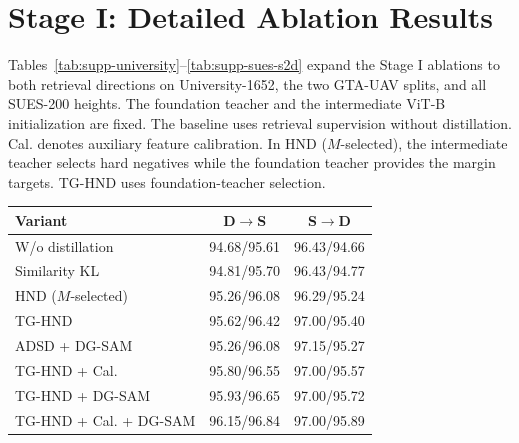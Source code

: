 \section{Stage I: Detailed Ablation Results}
\label{sec:supp-full}
Tables~\ref{tab:supp-university}--\ref{tab:supp-sues-s2d} expand the Stage I ablations to both retrieval directions on University-1652, the two GTA-UAV splits, and all SUES-200 heights. The foundation teacher and the intermediate ViT-B initialization are fixed. The baseline uses retrieval supervision without distillation. Cal. denotes auxiliary feature calibration. In HND ($M$-selected), the intermediate teacher selects hard negatives while the foundation teacher provides the margin targets. TG-HND uses foundation-teacher selection.

\par\medskip\noindent\begin{minipage}{\columnwidth}
\captionsetup{type=table}
\centering
\caption{Stage I University-1652 results. Cells report R@1/AP (\%).}
\label{tab:supp-university}
{\footnotesize\setlength{\tabcolsep}{2pt}\renewcommand{\arraystretch}{1.08}
\begin{tabular*}{\columnwidth}{@{\extracolsep{\fill}}lcc@{}}
\toprule
Variant & D$\rightarrow$S & S$\rightarrow$D \\
\midrule
W/o distillation & 94.68/95.61 & 96.43/94.66 \\
Similarity KL & 94.81/95.70 & 96.43/94.77 \\
HND ($M$-selected) & 95.26/96.08 & 96.29/95.24 \\
TG-HND & 95.62/96.42 & 97.00/95.40 \\
ADSD + DG-SAM & 95.26/96.08 & 97.15/95.27 \\
TG-HND + Cal. & 95.80/96.55 & 97.00/95.57 \\
TG-HND + DG-SAM & 95.93/96.65 & 97.00/95.72 \\
TG-HND + Cal. + DG-SAM & 96.15/96.84 & 97.00/95.89 \\
\bottomrule
\end{tabular*}}
\end{minipage}\par\medskip
